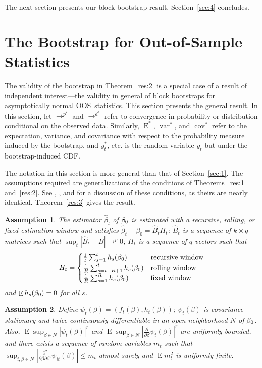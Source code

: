 \documentclass[12pt,fleqn]{article}
\newtheorem{asmp}{Assumption}[section]
\theoremstyle{definition}
\DeclareMathOperator{\E}{E}
\DeclareMathOperator{\var}{var}
\DeclareMathOperator{\cov}{cov}
\newcommand{\btrue}[1][]{\if#1*\hat\beta_{T+1}\else\beta_0\fi}
\newcommand{\cdf}{CDF}
\newcommand{\oos}{OOS}
\begin{document}
The next section presents our block bootstrap result.
Section~\ref{sec:4} concludes.

\section{The Bootstrap for Out-of-Sample Statistics}\label{sec:1b}
The validity of the bootstrap in Theorem~\ref{res:2} is a special case
of a result of independent interest---the validity in general of block
bootstraps for asymptotically normal \oos\ statistics.  This section
presents the general result.  In this section, let $\to^{p^{*}}$ and
$\to^{d^{*}}$ refer to convergence in probability or distribution
conditional on the observed data.  Similarly, $\E^{*}$, $\var^{*}$,
and $\cov^{*}$ refer to the expectation, variance, and covariance with
respect to the probability measure induced by the bootstrap, and
$y_t^{*}$, etc. is the random variable $y_t$ but under the
bootstrap-induced \cdf.

The notation in this section is more general than that of
Section~\ref{sec:1}.  The assumptions required are generalizations of
the conditions of Theorems~\ref{res:1} and~\ref{res:2}.  See
\citet{Wes:96,Wes:06}, \citet{WeM:98}, and \citet{Mcc:00} for a
discussion of these conditions, as theirs are nearly identical.
Theorem~\ref{res:3} gives the result.

\begin{asmp}\label{a1}
  The estimator $\hat{\beta}_t$ of $\btrue$ is estimated with a
  recursive, rolling, or fixed estimation window and satisfies
  $\hat{\beta}_{t} - \beta_{0} = \hat{B}_{t} H_t$; $\hat{B}_{t}$ is a
  sequence of $k \times q$ matrices such that $\sup_t |\hat{B}_t - B|
  \to^p 0$; $H_{t}$ is a sequence of $q$-vectors such that
  \begin{equation}
    H_{t} = \begin{cases}
      \tfrac1t \sum_{s=1}^t h_{s}(\btrue) & \text{recursive window} \\
      \tfrac1R \sum_{s=t-R+1}^t h_{s}(\btrue) & \text{rolling window} \\
      \tfrac1R \sum_{s=1}^R h_{s}(\btrue) & \text{fixed window} \\
    \end{cases}
  \end{equation}
  and $\E h_{s}(\btrue) = 0$ for all $s$.
\end{asmp}

\begin{asmp}\label{a2}
  Define $\psi_t(\beta) = (f_t(\beta), h_t(\beta))$; $\psi_t(\beta)$
  is covariance stationary and twice continuously differentiable in an
  open neighborhood $N$ of $\btrue$.  Also, $\E \sup_{\beta \in N}
  |\psi_t(\beta)|^r$ and $\E\sup_{\beta \in N}
  |\frac{\partial}{\partial \beta} \psi_t(\beta)|^r$ are uniformly
  bounded, and there exists a sequence of random variables $m_t$ such
  that $\sup_{i,\beta \in N} |\tfrac{\partial^2}{\partial
    \beta \partial \beta'} \psi_{it}(\beta)| \leq m_t$ almost surely
  and $\E m_t^2$ is uniformly finite.
\end{asmp}
\end{document}
